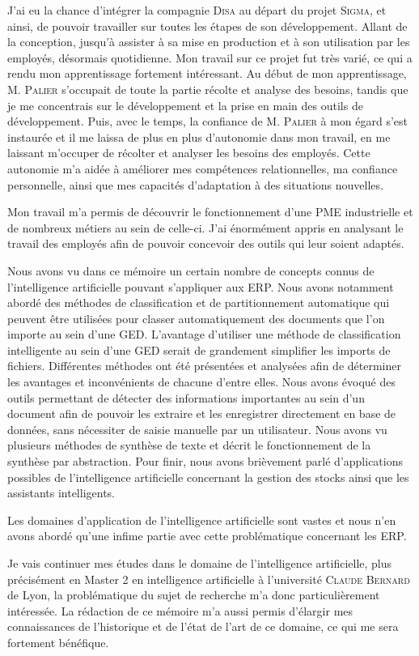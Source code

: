 
J'ai eu la chance d'intégrer la compagnie \textsc{Disa} au départ du projet \textsc{Sigma}, et ainsi, de pouvoir travailler sur toutes les étapes de son développement.
Allant de la conception, jusqu'à assister à sa mise en production et à son utilisation par les employés, désormais quotidienne.
Mon travail sur ce projet fut très varié, ce qui a rendu mon apprentissage fortement intéressant.
Au début de mon apprentissage, M. \textsc{Palier} s'occupait de toute la partie récolte et analyse des besoins, tandis que je me concentrais sur le développement et la prise en main des outils de développement.
Puis, avec le temps, la confiance de M. \textsc{Palier} à mon égard s'est instaurée et il me laissa de plus en plus d'autonomie dans mon travail, en me laissant m'occuper de récolter et analyser les besoins des employés.
Cette autonomie m'a aidée à améliorer mes compétences relationnelles, ma confiance personnelle, ainsi que mes capacités d'adaptation à des situations nouvelles.

Mon travail m'a permis de découvrir le fonctionnement d'une PME industrielle et de nombreux métiers au sein de celle-ci.
J'ai énormément appris en analysant le travail des employés afin de pouvoir concevoir des outils qui leur soient adaptés.

Nous avons vu dans ce mémoire un certain nombre de concepts connus de l'intelligence artificielle pouvant s'appliquer aux ERP.
Nous avons notamment abordé des méthodes de classification et de partitionnement automatique qui peuvent être utilisées pour classer automatiquement des documents que l'on importe au sein d'une GED.
L'avantage d'utiliser une méthode de classification intelligente au sein d'une GED serait de grandement simplifier les imports de fichiers.
Différentes méthodes ont été présentées et analysées afin de déterminer les avantages et inconvénients de chacune d'entre elles.
Nous avons évoqué des outils permettant de détecter des informations importantes au sein d'un document afin de pouvoir les extraire et les enregistrer directement en base de données, sans nécessiter de saisie manuelle par un utilisateur.
Nous avons vu plusieurs méthodes de synthèse de texte et décrit le fonctionnement de la synthèse par abstraction.
Pour finir, nous avons brièvement parlé d'applications possibles de l'intelligence artificielle concernant la gestion des stocks ainsi que les assistants intelligents.

Les domaines d'application de l'intelligence artificielle sont vastes et nous n'en avons abordé qu'une infime partie avec cette problématique concernant les ERP.

Je vais continuer mes études dans le domaine de l'intelligence artificielle, plus précisément en Master 2 en intelligence artificielle à l'université \textsc{Claude Bernard} de Lyon, la problématique du sujet de recherche m'a donc particulièrement intéressée.
La rédaction de ce mémoire m'a aussi permis d'élargir mes connaissances de l'historique et de l'état de l'art de ce domaine, ce qui me sera fortement bénéfique.
